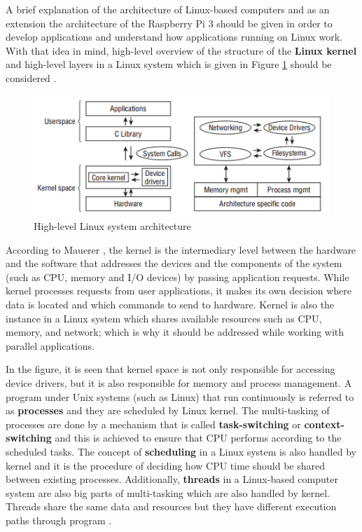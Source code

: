 A brief explanation of the architecture of Linux-based computers and as an extension the architecture of the Raspberry Pi 3 should be given in order to develop applications and understand how applications running on Linux work. With that idea in mind, high-level overview of the structure of  the \textbf{Linux kernel} and high-level layers in a Linux system which is given in Figure \ref{fig:linuxarchitecture} should be considered \cite{linuxkernelbook}.
\begin{figure}[!ht]
	\includegraphics[scale=0.9]{content/images/linuxarchitecture.png}
	\caption{High-level Linux system architecture \cite{linuxkernelbook}}
	\label{fig:linuxarchitecture}
\end{figure}

According to Mauerer \cite{linuxkernelbook}, the kernel is the intermediary level between the hardware and the software that addresses the devices and the components of the system (such as CPU, memory and I/O devices) by passing application requests. While kernel processes requests from user applications, it makes its own decision where data is located and which commands to send to hardware. Kernel is also the instance in a Linux system which shares available resources such as CPU, memory, and network; which is why it should be addressed while working with parallel applications.

In the figure, it is seen that kernel space is not only responsible for accessing device drivers, but it is also responsible for memory and process management. A program under Unix systems (such as Linux) that run continuously is referred to as \textbf{processes} and they are scheduled by Linux kernel. The multi-tasking of processes are done by a mechanism that is called \textbf{task-switching} or \textbf{context-switching} and this is achieved to ensure that CPU performs according to the scheduled tasks. The concept of \textbf{scheduling} in a Linux system is also handled by kernel and it is the procedure of deciding how CPU time should be shared between existing processes. Additionally, \textbf{threads} in a Linux-based computer system are also big parts of multi-tasking which are also handled by kernel. Threads share the same data and resources but they have different execution paths through program \cite{linuxkernelbook}.

